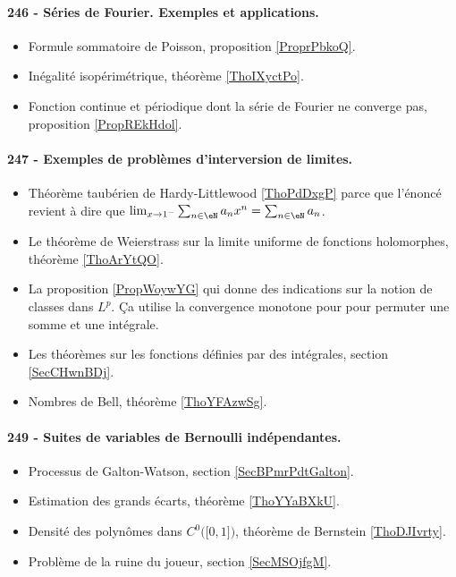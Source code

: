 \paragraph{246 - Séries de Fourier. Exemples et applications.}
\begin{itemize}
    \item Formule sommatoire de Poisson, proposition \ref{ProprPbkoQ}.
    \item Inégalité isopérimétrique, théorème \ref{ThoIXyctPo}.
    \item Fonction continue et périodique dont la série de Fourier ne converge pas, proposition \ref{PropREkHdol}.
\end{itemize}
\paragraph{247 - Exemples de problèmes d’interversion de limites.}
\begin{itemize}
    \item Théorème taubérien de Hardy-Littlewood \ref{ThoPdDxgP} parce que l'énoncé revient à dire que \( \lim_{x\to 1^-} \sum_{n\in \eN}a_nx^n=\sum_{n\in \eN}a_n\).
    \item Le théorème de Weierstrass sur la limite uniforme de fonctions holomorphes, théorème \ref{ThoArYtQO}.
    \item La proposition \ref{PropWoywYG} qui donne des indications sur la notion de classes dans \( L^p\). Ça utilise la convergence monotone pour  pour permuter une somme et une intégrale.
    \item Les théorèmes sur les fonctions définies par des intégrales, section \ref{SecCHwnBDj}.
    \item Nombres de Bell, théorème \ref{ThoYFAzwSg}.
\end{itemize}
\paragraph{249 - Suites de variables de Bernoulli indépendantes.}
\begin{itemize}
    \item Processus de Galton-Watson, section \ref{SecBPmrPdtGalton}.
    \item Estimation des grands écarts, théorème \ref{ThoYYaBXkU}.
    \item Densité des polynômes dans \( C^0\big( \mathopen[ 0 , 1 \mathclose] \big)\), théorème de Bernstein \ref{ThoDJIvrty}.
    \item Problème de la ruine du joueur, section \ref{SecMSOjfgM}.
\end{itemize}
